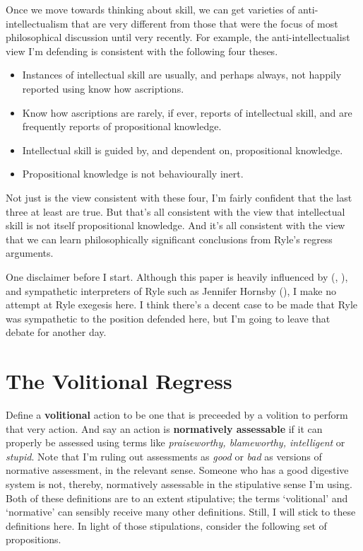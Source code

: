\documentclass[
  11pt,
  letterpaper,
  DIV=11,
  numbers=noendperiod,
  oneside]{scrartcl}
\providecommand{\tightlist}{%
  \setlength{\itemsep}{0pt}\setlength{\parskip}{0pt}}\usepackage{longtable,booktabs,array}
\begin{document}
Once we move towards thinking about skill, we can get varieties of
anti-intellectualism that are very different from those that were the
focus of most philosophical discussion until very recently. For example,
the anti-intellectualist view I'm defending is consistent with the
following four theses.

\begin{itemize}
\tightlist
\item
  Instances of intellectual skill are usually, and perhaps always, not
  happily reported using know how ascriptions.
\item
  Know how ascriptions are rarely, if ever, reports of intellectual
  skill, and are frequently reports of propositional knowledge.
\item
  Intellectual skill is guided by, and dependent on, propositional
  knowledge.
\item
  Propositional knowledge is not behaviourally inert.
\end{itemize}

Not just is the view consistent with these four, I'm fairly confident
that the last three at least are true. But that's all consistent with
the view that intellectual skill is not itself propositional knowledge.
And it's all consistent with the view that we can learn philosophically
significant conclusions from Ryle's regress arguments.

One disclaimer before I start. Although this paper is heavily influenced
by (, ),
and sympathetic interpreters of Ryle such as Jennifer Hornsby
(), I make no attempt at Ryle exegesis
here. I think there's a decent case to be made that Ryle was sympathetic
to the position defended here, but I'm going to leave that debate for
another day.

\section{The Volitional Regress}\label{the-volitional-regress}

Define a \textbf{volitional} action to be one that is preceeded by a
volition to perform that very action. And say an action is
\textbf{normatively assessable} if it can properly be assessed using
terms like \emph{praiseworthy, blameworthy, intelligent} or
\emph{stupid}. Note that I'm ruling out assessments as \emph{good} or
\emph{bad} as versions of normative assessment, in the relevant sense.
Someone who has a good digestive system is not, thereby, normatively
assessable in the stipulative sense I'm using. Both of these definitions
are to an extent stipulative; the terms `volitional' and `normative' can
sensibly receive many other definitions. Still, I will stick to these
definitions here. In light of those stipulations, consider the following
set of propositions.
\end{document}
